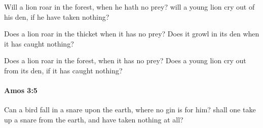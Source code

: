 			\begin{versebox}
					\item[BHS] 
					\item[LXX] 
					\item[ASV] Will a lion roar in the forest, when he hath no prey? will a young lion cry out of his den, if he have taken nothing?
					\item[NIV] Does a lion roar in the thicket when it has no prey? Does it growl in its den when it has caught nothing?
					\item[NRSV] Does a lion roar in the forest, when it has no prey? Does a young lion cry out from its den, if it has caught nothing?
			\end{versebox}

		\paragraph{Amos 3:5} %
			\label{AMOS-3-5}

			Can a bird fall in a snare upon the earth, where no gin is for him? shall one take up a snare from the earth, and have taken nothing at all?

